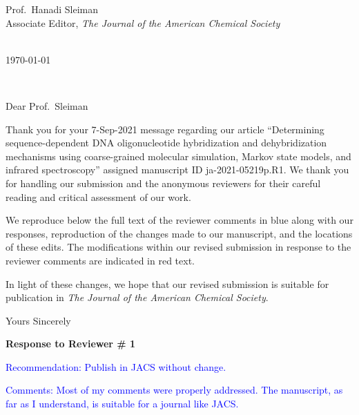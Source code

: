 \documentclass[11pt,a4paper]{letter} %
\makeatletter
\def\opening#1{\thispagestyle{empty}
{\centering\fromaddress \vspace{1.1in} \\ %
%
\hspace*{4.15 in}\today\hspace*{\fill}\par
} %
{\raggedright \toname \\ \toaddress \par} %
\vspace{0.05in} %
\noindent #1 %
}
\makeatother
\begin{document}

\begin{letter}
{
Prof.\ Hanadi Sleiman \\
Associate Editor, \textit{The Journal of the American Chemical Society}
}


\opening{Dear Prof.\ Sleiman}

Thank you for your 7-Sep-2021 message regarding our article ``Determining sequence-dependent DNA oligonucleotide hybridization and dehybridization mechanisms using coarse-grained molecular simulation, Markov state models, and infrared spectroscopy'' assigned manuscript ID ja-2021-05219p.R1. We thank you for handling our submission and the anonymous reviewers for their careful reading and critical assessment of our work.

We reproduce below the full text of the reviewer comments in blue along with our responses, reproduction of the changes made to our manuscript, and the locations of these edits. The modifications within our revised submission in response to the reviewer comments are indicated in red text. 

In light of these changes, we hope that our revised submission is suitable for publication in \textit{The Journal of the American Chemical Society}.

\closing{Yours Sincerely}

\end{letter}


\clearpage
\newpage

\begin{shaded}
\textbf{Response to Reviewer \# 1}
\end{shaded}

\textcolor{blue}{Recommendation: Publish in JACS without change.
}

\textcolor{blue}{Comments:
Most of my comments were properly addressed. The manuscript, as far as I understand, is suitable for a journal like JACS.
}
\end{document}
